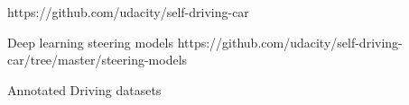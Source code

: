 https://github.com/udacity/self-driving-car

Deep learning steering models
https://github.com/udacity/self-driving-car/tree/master/steering-models

Annotated Driving datasets
